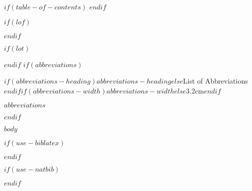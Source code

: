 \documentclass[letterpaper, $if(page-layout)$$page-layout$$else$nobind$endif$]{templates/ociamthesis}
\begin{document}
\begin{romanpages}
$if(table-of-contents)$
\tableofcontents
$endif$

$if(lof)$
\listoffigures
	\mtcaddchapter
$endif$

$if(lot)$
\listoftables
  \mtcaddchapter
$endif$
$if(abbreviations)$
\begin{mclistof}{$if(abbreviations-heading)$$abbreviations-heading$$else$List of Abbreviations$endif$}{$if(abbreviations-width)$$abbreviations-width$$else$3.2cm$endif$}

$abbreviations$

\end{mclistof} 

$endif$

\end{romanpages}

\flushbottom

$body$

$if(use-biblatex)$
\setlength{\baselineskip}{0pt} %

{\renewcommand*\MakeUppercase[1]{#1}%
\printbibliography[heading=none]}

$endif$

$if(use-natbib)$

$endif$
\end{document}
